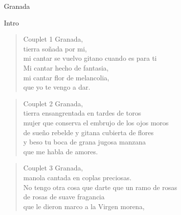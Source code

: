 \begin{song}[vals]{Granada}
\begin{instrumental}{Intro}
\end{instrumental}

\begin{verse}{Couplet 1}
Granada,\\
\chord{\_\_\_\_\_\_\_\_\_\_\_\_\_\_}tierra soñada por mi,\\
\chord{\_\_\_\_\_\_\_\_\_\_\_\_\_\_\_\_\_\_\_\_}mi cantar se vuelvo gitano cuando es para ti\\
Mi cantar hecho de fantasia,\\
mi cantar flor de melancolia,\\
\chord{\_\_\_\_\_\_\_}que yo te vengo a dar.\\
\end{verse}

\begin{verse}{Couplet 2}
Granada,\\
tierra \hspace{1em} ensangrentada en tardes de toros\\
mujer que conserva el embrujo de los o\chord{$\downarrow$}jos moros \\
de sueño rebelde y gitana cubierta \chord{$\downarrow$}de flores\\
y beso tu boca de grana jugosa manzana\\
que me habla de amores.\\
\end{verse}

\begin{verse}{Couplet 3}
Granada,\\
manola cantada en coplas \chord{$\downarrow$}\hspace{0.5em} preciosas.\\
No tengo otra cosa que darte que un ramo \chord{$\downarrow$}\hspace{0.5em} de rosas\\
de rosas de suave fragancia\\
que le dieron marco a la Virgen morena,  \\
\end{verse}


\end{song}
